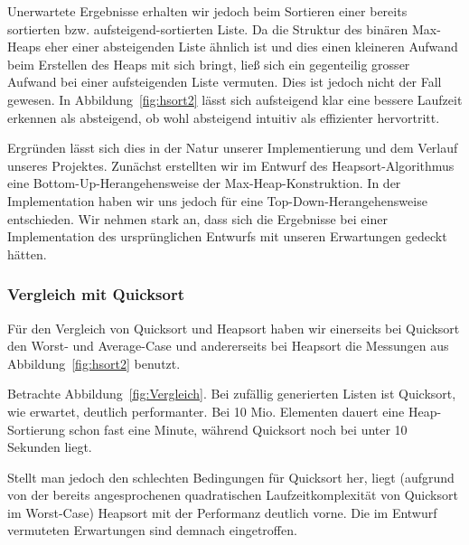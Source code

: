 Unerwartete Ergebnisse erhalten wir jedoch beim Sortieren einer bereits
sortierten bzw. aufsteigend-sortierten Liste.
Da die Struktur des binären Max-Heaps eher einer absteigenden Liste ähnlich
ist und dies einen kleineren Aufwand beim Erstellen des Heaps mit sich bringt,
ließ sich
ein gegenteilig grosser Aufwand bei einer aufsteigenden Liste vermuten.
Dies ist jedoch nicht der Fall gewesen.
In Abbildung~\ref{fig:hsort2} lässt sich aufsteigend klar eine bessere
Laufzeit erkennen als absteigend, ob wohl absteigend intuitiv als effizienter
hervortritt.

Ergründen lässt sich dies in der Natur unserer Implementierung und dem
Verlauf unseres Projektes.
Zunächst erstellten wir im Entwurf des Heapsort-Algorithmus eine
Bottom-Up-Herangehensweise der Max-Heap-Konstruktion.
In der Implementation haben wir uns jedoch für eine Top-Down-Herangehensweise
entschieden.
Wir nehmen stark an, dass sich die Ergebnisse bei einer Implementation des
ursprünglichen Entwurfs mit unseren Erwartungen gedeckt hätten.

\subsubsection{Vergleich mit Quicksort}\label{subsec:Vergleich mit Quicksort}

Für den Vergleich von Quicksort und Heapsort haben wir einerseits bei Quicksort den Worst- und Average-Case und andererseits bei Heapsort die Messungen aus Abbildung~\ref{fig:hsort2} benutzt.

Betrachte Abbildung~\ref{fig:Vergleich}.
Bei zufällig generierten Listen ist Quicksort, wie erwartet, deutlich
performanter.
Bei 10 Mio. Elementen dauert eine Heap-Sortierung schon fast eine Minute,
während Quicksort noch bei unter 10 Sekunden liegt.

Stellt man jedoch den schlechten Bedingungen für Quicksort her, liegt
(aufgrund von der bereits angesprochenen quadratischen Laufzeitkomplexität
von Quicksort im Worst-Case) Heapsort mit der Performanz deutlich vorne. Die
im Entwurf vermuteten Erwartungen sind demnach eingetroffen.



